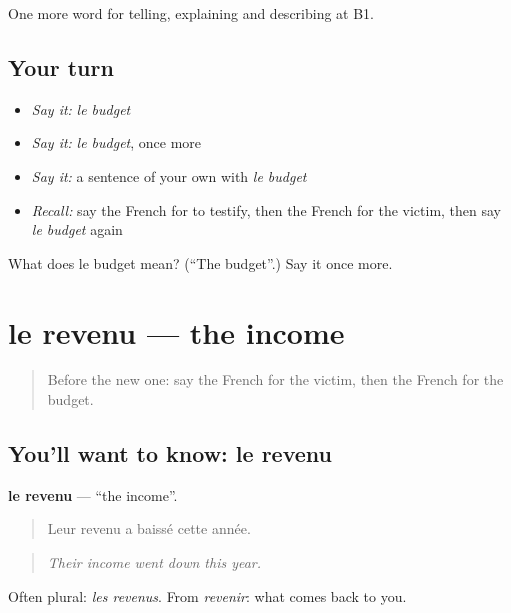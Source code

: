 \begin{grammarlens}[title={What you've built}]
One more word for telling, explaining and describing at B1.
\end{grammarlens}

\subsection*{Your turn}
\begin{itemize}
\raggedright
  \item \emph{Say it:} \emph{le budget}
  \item \emph{Say it:} \emph{le budget}, once more
  \item \emph{Say it:} a sentence of your own with \emph{le budget}
  \item \emph{Recall:} say the French for to testify, then the French for the victim, then say \emph{le budget} again
\end{itemize}

\begin{tcolorbox}[breakable,colback=teal!4,colframe=teal!35!black,title={Before you move on}]
What does le budget mean? (\textquotedblleft{}The budget\textquotedblright{}.) Say it once more.
\end{tcolorbox}
\section[le revenu]{le revenu — the income}

\label{lesson:FR-C390-revenu}



\begin{quote}
Before the new one: say the French for the victim, then the French for the budget.
\end{quote}

\subsection*{You'll want to know: le revenu}
\textbf{le revenu} — \textquotedblleft{}the income\textquotedblright{}.

\begin{quote}
Leur revenu a baissé cette année.
\end{quote}

\begin{quote}
\emph{Their income went down this year.}
\end{quote}

Often plural: \emph{les revenus}. From \emph{revenir}: what comes back to you.


